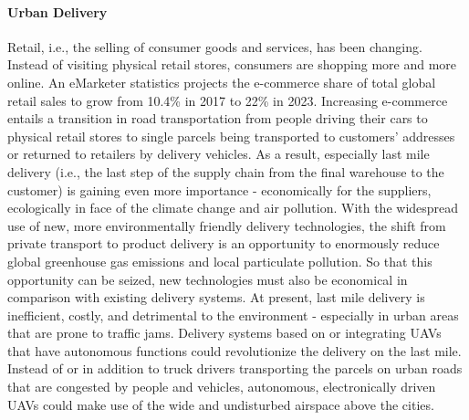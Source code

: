 \paragraph{Urban Delivery}




Retail, i.e., the selling of consumer goods and services, has been changing. 
Instead of visiting physical retail stores, consumers are shopping more and more online.
An eMarketer \cite{eMarketer2019} statistics projects the e-commerce share of total global retail sales 
to grow from 10.4\% in 2017 to 22\% in 2023.
Increasing e-commerce entails a transition in road transportation from people driving their cars to physical retail stores
to single parcels being transported to customers' addresses or returned to retailers by delivery vehicles. \cite{Weideli2013}
As a result, especially  last mile delivery (i.e., the last step of the supply chain from the final warehouse to the customer) 
is gaining even more importance
- economically for the suppliers, ecologically in face of the climate change and air pollution.
With the widespread use of new, more environmentally friendly delivery technologies, 
the shift from private transport to product delivery is an opportunity 
to enormously reduce global greenhouse gas emissions and local particulate pollution.
So that this opportunity can be seized, new technologies must also be economical in comparison with existing delivery systems.
At present, last mile delivery is inefficient, costly, and detrimental to the environment 
- especially  in urban areas that are prone to traffic jams.
Delivery systems based on or integrating UAVs that have autonomous functions could revolutionize the delivery on the last mile.
Instead of or in addition to truck drivers transporting the parcels on urban roads that are congested by people and vehicles, 
autonomous, electronically driven UAVs could make use of the wide and undisturbed airspace above the cities.

